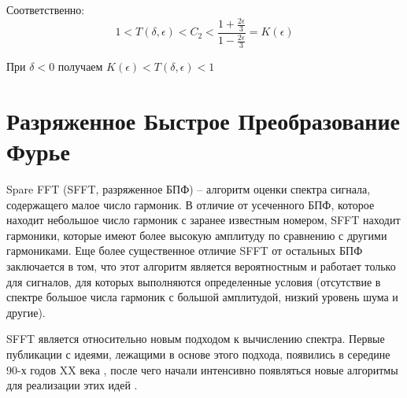 Соответственно:
\begin{equation}
	\label{eq:equation112}
	1 < T(\delta, \epsilon) < C_{2} < \frac{1 + \frac{2 \epsilon}{3}}{1 - \frac{2 \epsilon}{3}} = K(\epsilon)
\end{equation} 

При $\delta <0$ получаем $K(\epsilon) < T(\delta, \epsilon) < 1$ 

\section{Разряженное Быстрое Преобразование Фурье} \label{sec:ch3/sect6}

Spare FFT (SFFT, разряженное БПФ) -- алгоритм оценки спектра сигнала, содержащего малое число гармоник. В отличие от усеченного БПФ, которое находит небольшое число гармоник с заранее известным номером, SFFT находит гармоники, которые имеют более высокую амплитуду по сравнению с другими гармониками. Еще более существенное отличие SFFT от остальных БПФ заключается в том, что этот алгоритм является вероятностным и работает только для сигналов, для которых выполняются определенные условия (отсутствие в спектре большое числа гармоник с большой амплитудой, низкий уровень шума и другие).

SFFT является относительно новым подходом к вычислению спектра.
Первые публикации с идеями, лежащими в основе этого подхода, появились в
середине 90-х годов XX века \cite{kushilevitz1993learning}, после чего начали интенсивно появляться
новые алгоритмы для реализации этих идей \cite{hassanieh2012faster, hassanieh2012nearly, pawar2013computing, schumacher2014high, hassanieh2012simple}.

